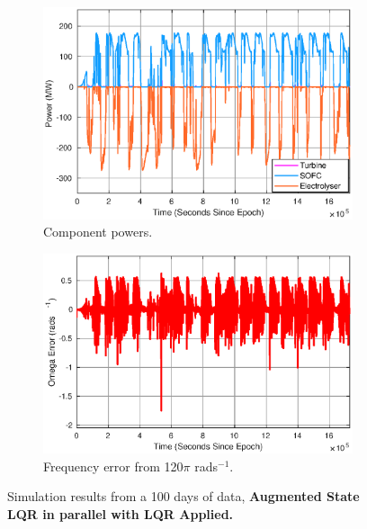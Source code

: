 \begin{figure}
\centering
\begin{subfigure}{.5\textwidth}
  \centering
  \includegraphics[width=1\linewidth]{images/results/LQR/use.eps}
  \caption{Component powers.}
  \label{fig:lqruse}
\end{subfigure}%
\begin{subfigure}{.5\textwidth}
  \centering
  \includegraphics[width=1\linewidth]{images/results/LQR/omega.eps}
  \caption{Frequency error from 120$\pi$ rads$^{-1}$.}
  \label{fig:lqromega}
\end{subfigure}
\caption{Simulation results from a 100 days of data, {\bf Augmented State LQR in parallel with LQR Applied.}}
\label{fig:lqrtest}
\end{figure}







